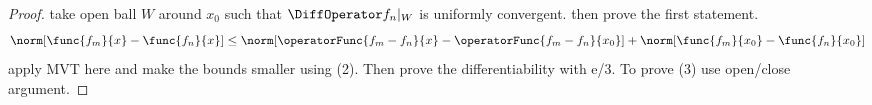 \begin{proof}
    take open ball \(W\) around \(x_0\) such that \(\DiffOperator f_n|_W\) is uniformly convergent. then prove the first statement.
    \begin{equation*}
        \norm[\func{f_m}{x} - \func{f_n}{x}] \leq \norm[\operatorFunc{f_m - f_n}{x} - \operatorFunc{f_m - f_n}{x_0}] + \norm[\func{f_m}{x_0} - \func{f_n}{x_0}]
    \end{equation*}
    apply MVT here and make the bounds smaller using (2). Then prove the differentiability with e/3. To prove (3) use open/close argument.
\end{proof}

\begin{corollary}

\end{corollary}
